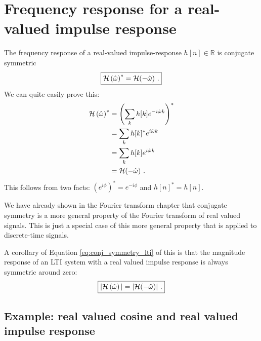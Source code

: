 \section{Frequency response for a real-valued impulse response}

The frequency response of a real-valued impulse-response
$h[n]\in \mathbb{R}$ is conjugate symmetric
\begin{equation}
\boxed{
\mathcal{H}\left(\hat{\omega}\right)^* = \mathcal{H}(-\hat{\omega})\,\,.
}
\label{eq:conj_symmetry_lti}
\end{equation}
We can quite easily prove this:
\begin{align}
\mathcal{H}\left(\hat{\omega}\right)^* &= \left(\sum_k h[k] e^{-i\hat{\omega}k}\right)^* \\
        &= \sum_k h[k]^* e^{i\hat{\omega}k} \\
        &= \sum_k h[k] e^{i\hat{\omega}k} \\
        &= \mathcal{H}(-\hat{\omega})\,\,.
\end{align}
This follows from two facts: $(e^{i\phi})^* = e^{-i\phi}$ and $h[n]^*
= h[n]$.

We have already shown in the Fourier transform chapter that conjugate
symmetry is a more general property of the Fourier transform of real
valued signals. This is just a special case of this more general
property that is applied to discrete-time signals.

A corollary of Equation \ref{eq:conj_symmetry_lti} of this is that the
magnitude response of an LTI system with a real valued impulse
response is always symmetric around zero:
\begin{equation}
\boxed{
|\mathcal{H}\left(\hat{\omega}\right)| = |\mathcal{H}(-\hat{\omega})|\,\,.
}
\end{equation}

\subsection{Example: real valued cosine and real valued impulse response}

